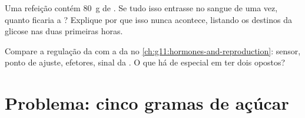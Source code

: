 \begin{exercise}[$\star\star\star$]\label{exo:g12:glucose-and-diabetes:14}
Uma refeição contém \qty{80}{g} de . Se tudo isso entrasse
no sangue de uma vez, quanto ficaria a ? Explique por que isso
nunca acontece, listando os destinos da glicose nas duas primeiras horas.
\end{exercise}

\begin{exercise}[$\star\star\star$]\label{exo:g12:glucose-and-diabetes:15}
Compare a regulação da  com a da  no
\cref{ch:g11:hormones-and-reproduction}: sensor, ponto de ajuste,
efetores, sinal da . O que há de especial em ter dois
 opostos?
\end{exercise}

\section{Problema: cinco gramas de açúcar}

